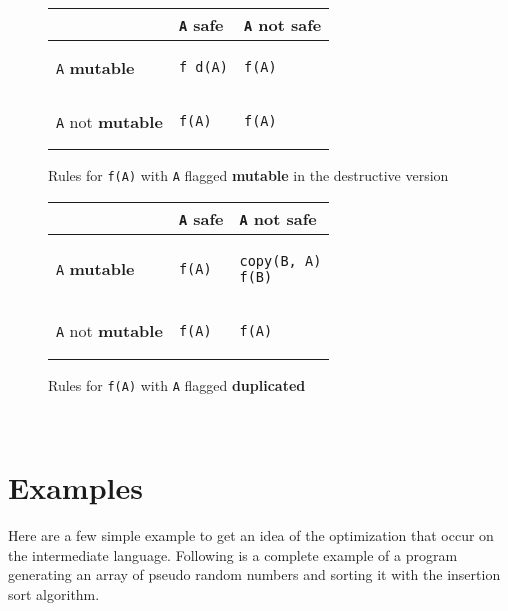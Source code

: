 \documentclass[12pt,a4paper]{article}
\newcommand{\cl}[1]{\texttt{#1}}
\newcommand{\bang}{ \textbf{ mutable } }
\newcommand{\safe}{ \textbf{ safe } }
\newcommand{\dupl}{ \textbf{ duplicated } }
\begin{document}
\begin{figure}[!ht]
\begin{tabular}{|p{5.5cm}|p{5.5cm}|p{6cm}|}
\hline
             & \cl{A} \safe & \cl{A} not \safe \\ \hline
\cl{A} \bang  &
\begin{lstlisting}
f_d(A)
\end{lstlisting} & \begin{lstlisting}
f(A)
\end{lstlisting} \\ \hline
\cl{A} not \bang & \begin{lstlisting}
f(A)
\end{lstlisting} & \begin{lstlisting}
f(A)
\end{lstlisting} \\ \hline
\end{tabular}
\caption{Rules for \cl{f(A)} with \cl{A} flagged \bang in the destructive version}
\end{figure}


\begin{figure}[!ht]
\begin{tabular}{|p{5.5cm}|p{5.5cm}|p{6cm}|}
\hline
             & \cl{A} \safe & \cl{A} not \safe \\ \hline
\cl{A} \bang  &
\begin{lstlisting}
f(A)
\end{lstlisting} & \begin{lstlisting}
copy(B, A)
f(B)
\end{lstlisting} \\ \hline
\cl{A} not \bang & \begin{lstlisting}
f(A)
\end{lstlisting} & \begin{lstlisting}
f(A)
\end{lstlisting} \\ \hline
\end{tabular}
\caption{Rules for \cl{f(A)} with \cl{A} flagged \dupl}
\end{figure}






\newpage
\
\newpage

\section{Examples}
Here are a few simple example to get an idea of the optimization that occur on the intermediate language. Following is a complete example of a program generating an array of pseudo random numbers and sorting it with the insertion sort algorithm.
\end{document}
